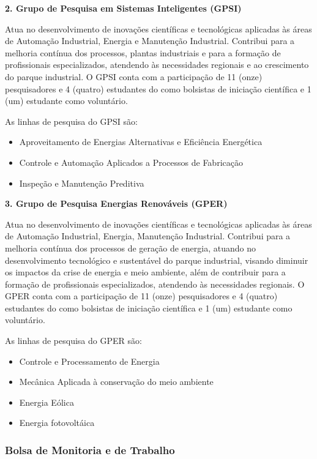 \documentclass{paper}
\begin{document}
\noindent \textbf{2. Grupo de Pesquisa em Sistemas Inteligentes (GPSI)}

Atua no desenvolvimento de inovações científicas e tecnológicas aplicadas às áreas de Automação Industrial, Energia e Manutenção Industrial. Contribui para a melhoria contínua dos processos, plantas industriais e para a formação de profissionais especializados, atendendo às necessidades regionais e ao crescimento do parque industrial. O GPSI conta com a participação de 11 (onze) pesquisadores e 4 (quatro) estudantes do \NOMECURSO como bolsistas de iniciação científica e 1 (um) estudante como voluntário.

As linhas de pesquisa do GPSI são:
\begin{itemize}
\item Aproveitamento de Energias Alternativas e Eficiência Energética
\item Controle e Automação Aplicados a Processos de Fabricação
\item Inspeção e Manutenção Preditiva
\end{itemize}


\noindent \textbf{3. Grupo de Pesquisa Energias Renováveis (GPER)}

Atua no desenvolvimento de inovações científicas e tecnológicas aplicadas às áreas de Automação Industrial, Energia, Manutenção Industrial. Contribui para a melhoria contínua dos processos de geração de energia, atuando no desenvolvimento tecnológico e sustentável do parque industrial, visando diminuir os impactos da crise de energia e meio ambiente, além de contribuir para a formação de profissionais especializados, atendendo às necessidades regionais. O GPER conta com a participação de 11 (onze) pesquisadores e 4 (quatro) estudantes do \NOMECURSO como bolsistas de iniciação científica e 1 (um) estudante como voluntário.

As linhas de pesquisa do GPER são:
\begin{itemize}
\item Controle e Processamento de Energia
\item Mecânica Aplicada à conservação do meio ambiente
\item Energia Eólica
\item Energia fotovoltáica
\end{itemize}

\subsubsection{Bolsa de Monitoria e de Trabalho}
\end{document}
